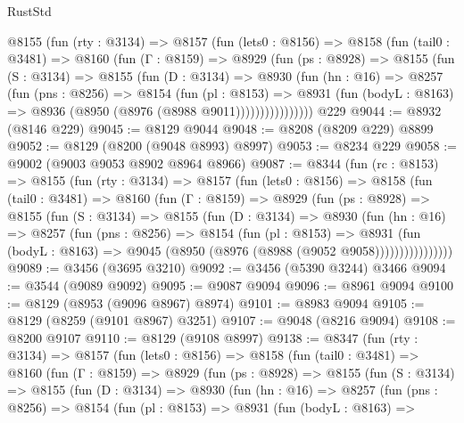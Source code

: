 \begin{lexlean}{RustStd}
\begin{coremodule}
      @8155
        (fun (rty : @3134) =>
        @8157
          (fun (lets0 : @8156) =>
          @8158
            (fun (tail0 : @3481) =>
            @8160
              (fun (Γ : @8159) =>
              @8929
                (fun (ps : @8928) =>
                @8155
                  (fun (S : @3134) =>
                  @8155
                    (fun (D : @3134) =>
                    @8930
                      (fun (hn : @16) =>
                      @8257
                        (fun (pns : @8256) =>
                        @8154
                          (fun (pl : @8153) =>
                          @8931
                            (fun (bodyL : @8163) => @8936 (@8950 (@8976 (@8988 @9011))))))))))))))))
    @229
@9044 := @8932 (@8146 @229)
@9045 := @8129 @9044
@9048 := @8208 (@8209 @229) @8899
@9052 := @8129 (@8200 (@9048 @8993) @8997)
@9053 := @8234 @229
@9058 := @9002 (@9003 @9053 @8902 @8964 @8966)
@9087 := @8344
    (fun (rc : @8153) =>
    @8155
      (fun (rty : @3134) =>
      @8157
        (fun (lets0 : @8156) =>
        @8158
          (fun (tail0 : @3481) =>
          @8160
            (fun (Γ : @8159) =>
            @8929
              (fun (ps : @8928) =>
              @8155
                (fun (S : @3134) =>
                @8155
                  (fun (D : @3134) =>
                  @8930
                    (fun (hn : @16) =>
                    @8257
                      (fun (pns : @8256) =>
                      @8154
                        (fun (pl : @8153) =>
                        @8931
                          (fun (bodyL : @8163) =>
                          @9045 (@8950 (@8976 (@8988 (@9052 @9058))))))))))))))))
@9089 := @3456 (@3695 @3210)
@9092 := @3456 (@5390 @3244) @3466
@9094 := @3544 (@9089 @9092)
@9095 := @9087 @9094
@9096 := @8961 @9094
@9100 := @8129 (@8953 (@9096 @8967) @8974)
@9101 := @8983 @9094
@9105 := @8129 (@8259 (@9101 @8967) @3251)
@9107 := @9048 (@8216 @9094)
@9108 := @8200 @9107
@9110 := @8129 (@9108 @8997)
@9138 := @8347
    (fun (rty : @3134) =>
    @8157
      (fun (lets0 : @8156) =>
      @8158
        (fun (tail0 : @3481) =>
        @8160
          (fun (Γ : @8159) =>
          @8929
            (fun (ps : @8928) =>
            @8155
              (fun (S : @3134) =>
              @8155
                (fun (D : @3134) =>
                @8930
                  (fun (hn : @16) =>
                  @8257
                    (fun (pns : @8256) =>
                    @8154
                      (fun (pl : @8153) =>
                      @8931
                        (fun (bodyL : @8163) =>

\end{coremodule}
\end{lexlean}
